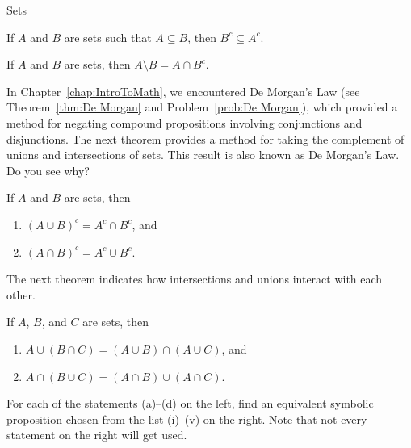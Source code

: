 \begin{section}{Sets}
\begin{theorem}
If $A$ and $B$ are sets such that $A \subseteq B$, then $B^c \subseteq A^c$.
\end{theorem}

\begin{theorem}
If $A$ and $B$ are sets, then $A\setminus B = A \cap B^c$.
\end{theorem}


In Chapter~\ref{chap:IntroToMath}, we encountered De Morgan's Law (see Theorem~\ref{thm:De Morgan} and Problem~\ref{prob:De Morgan}), which provided a method for negating compound propositions involving conjunctions and disjunctions.  The next theorem provides a method for taking the complement of unions and intersections of sets.  This result is also known as De Morgan's Law. Do you see why?

\begin{theorem}
If $A$ and $B$ are sets, then
\begin{enumerate}[label=\textrm{(\alph*)}]
\item $(A \cup B)^c = A^c \cap B^c$, and
\item $(A \cap B)^c = A^c \cup B^c$.
\end{enumerate}
\end{theorem}

The next theorem indicates how intersections and unions interact with each other.

\begin{theorem}
If $A$, $B$, and $C$ are sets, then
\begin{enumerate}[label=\textrm{(\alph*)}]
\item $A \cup(B\cap C) = (A\cup B)\cap (A\cup C)$, and
\item $A\cap (B\cup C)= (A\cap B)\cup (A\cap C)$.
\end{enumerate}
\end{theorem}

\begin{problem}
For each of the statements (a)--(d) on the left, find an equivalent symbolic proposition chosen from the list (i)--(v) on the right.  Note that not every statement on the right will get used.


\end{problem}
\end{section}
